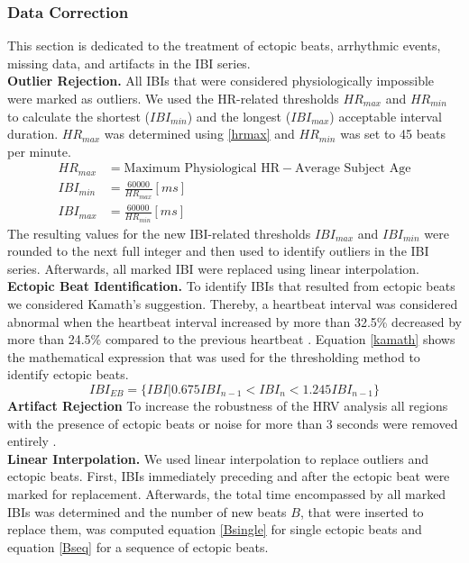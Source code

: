 \subsubsection{Data Correction}
This section is dedicated to the treatment of ectopic beats, arrhythmic events, missing data, and artifacts in the IBI series. \\
\textbf{Outlier Rejection.} All IBIs that were considered physiologically impossible were marked as outliers. We used the HR-related thresholds $HR_{max}$ and $HR_{min}$ to calculate the shortest ($IBI_{min}$) and the longest ($IBI_{max}$) acceptable interval duration. $HR_{max}$ was determined using \ref{hrmax} and $HR_{min}$ was set to 45 beats per minute.
\begin{align}\label{hrmax}
HR_{max} &= \text{Maximum Physiological HR} - \text{Average Subject Age}\\
IBI_{min} &= \frac{60000}{HR_{max}}	[ms]\\
IBI_{max} &= \frac{60000}{HR_{min}}	[ms]
\end{align}
The resulting values for the new IBI-related thresholds $IBI_{max}$ and $IBI_{min}$ were rounded to the next full integer and then used to identify outliers in the IBI series. Afterwards, all marked IBI were replaced using linear interpolation.\\
\textbf{Ectopic Beat Identification.} To identify IBIs that resulted from ectopic beats we considered Kamath's suggestion. Thereby, a heartbeat interval was considered abnormal when the heartbeat interval increased by more than 32.5\% decreased by more than 24.5\% compared to the previous heartbeat \cite{Choi2016}. Equation \ref{kamath} shows the mathematical expression that was used for the thresholding method to identify ectopic beats. 
\begin{equation} \label{kamath}
IBI_{EB} = \lbrace IBI\vert 0.675 IBI_{n-1} < IBI_{n} < 1.245 IBI_{n-1}\rbrace  
\end{equation}
\textbf{Artifact Rejection} To increase the robustness of the HRV analysis all regions with the presence of ectopic beats or noise for more than 3 seconds were removed entirely \cite{Clifford2002}.\\
\textbf{Linear Interpolation.} We used linear interpolation to replace outliers and ectopic beats. First, IBIs immediately preceding and after the ectopic beat were marked for replacement. Afterwards, the total time encompassed by all marked IBIs was determined and the number of new beats $B$, that were inserted to replace them, was computed equation \ref{Bsingle} for single ectopic beats and equation \ref{Bseq} for a sequence of ectopic beats.

